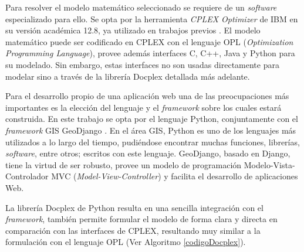 
Para resolver el modelo matemático seleccionado se requiere de un \textit{software} especializado para ello. Se opta por la herramienta \textit{CPLEX Optimizer} de IBM \citep{CPLEXOptimizer} en su versión académica 12.8, ya utilizado en trabajos previos \citep{Vecchi2016ACollection,Ramos2018TheApproaches,BabaeeTirkolaee2019DevelopingStudy}. El modelo matemático puede ser codificado en CPLEX con el lenguaje OPL ({\textit{Optimization Programming Language}}), provee además interfaces C, C++, Java y Python para su modelado. Sin embargo, estas interfaces no son usadas directamente para modelar sino a través de la librería Docplex \citep{Docplex} detallada más adelante.

Para el desarrollo propio de una aplicación web una de las preocupaciones más importantes es la elección del lenguaje y el \textit{framework} sobre los cuales estará construida. En este trabajo se opta por el lenguaje Python, conjuntamente con el \textit{framework} GIS GeoDjango \citep{GeoDjango}. En el área GIS, Python es uno de los lenguajes más utilizados a lo largo del tiempo, pudiéndose encontrar muchas funciones, librerías, \textit{software}, entre otros; escritos con este lenguaje. GeoDjango, basado en Django, tiene la virtud de ser robusto, provee un modelo de programación Modelo-Vista-Controlador MVC (\textit{Model-View-Controller}) y facilita el desarrollo de aplicaciones Web.

La librería Docplex de Python resulta en una sencilla integración con el \textit{framework}, también permite formular el modelo de forma clara y directa en comparación con las interfaces de CPLEX, resultando muy similar a la formulación con el lenguaje OPL (Ver Algoritmo \ref{codigoDocplex}).

